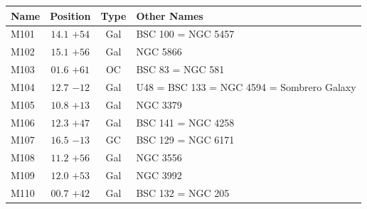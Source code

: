 \begin{table}[t]
    \setlength{\tabcolsep}{2pt}
    \footnotesize
    \begin{tabularx}{\linewidth}{lccX}
        \hline
        Name&Position&Type&Other Names\\
        \hline

M101 &$14.1$ $+54$&Gal&BSC 100 = NGC 5457\\
M102 &$15.1$ $+56$&Gal&NGC 5866\\
M103 &$01.6$ $+61$&OC &BSC 83 = NGC 581\\
M104 &$12.7$ $-12$&Gal&U48 = BSC 133 = NGC 4594 = Sombrero Galaxy\\
M105 &$10.8$ $+13$&Gal&NGC 3379\\
M106 &$12.3$ $+47$&Gal&BSC 141 = NGC 4258\\
M107 &$16.5$ $-13$&GC &BSC 129 = NGC 6171\\
M108 &$11.2$ $+56$&Gal&NGC 3556\\
M109 &$12.0$ $+53$&Gal&NGC 3992\\
M110 &$00.7$ $+42$&Gal&BSC 132 = NGC 205\\

        \hline
    \end{tabularx}
\end{table}
\clearpage

